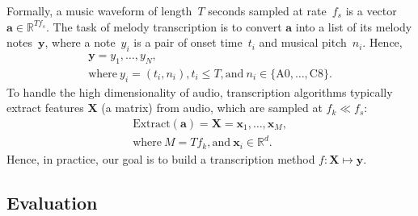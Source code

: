 Formally, a music waveform of length~$T$ seconds sampled at rate~$f_s$ is a vector~${\bm{a} \in \mathbb{R}^{Tf_s}}$. 
The task of melody transcription is to convert $\bm{a}$ into a list of its melody notes~$\bm{y}$, 
where a note~$y_i$ is a pair of onset time~$t_i$ and musical pitch~$n_i$. 
Hence, 
\begin{gather*}
    \bm{y} = y_1, \ldots, y_N, \\
    \text{where}~y_i = (t_i, n_i), t_i \leq T, \text{and}~n_i \in \{\text{A0}, \ldots, \text{C8}\}.
\end{gather*}
To handle the high dimensionality of audio, transcription algorithms typically extract features $\bm{X}$ (a matrix) from audio, which are sampled at ${f_k \ll f_s}$:
\begin{gather*}
    \text{Extract}(\bm{a}) = \bm{X} = \bm{x}_1, \ldots, \bm{x}_M, \\ 
    \text{where}~M = Tf_k, \text{and}~\bm{x}_i \in \mathbb{R}^d.
\end{gather*}
Hence, in practice, our goal is to build a transcription method 
${f : \bm{X} \mapsto \bm{y}}$.

\subsection{Evaluation}
\label{sec:eval}


